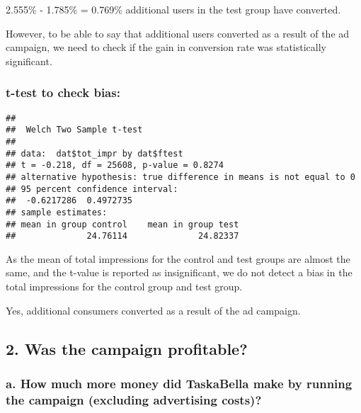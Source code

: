 \documentclass[
]{article}
\newenvironment{Shaded}{\begin{snugshade}}{\end{snugshade}}
\newcommand{\KeywordTok}[1]{\textcolor[rgb]{0.13,0.29,0.53}{\textbf{#1}}}
\newcommand{\NormalTok}[1]{#1}
\newcommand{\OperatorTok}[1]{\textcolor[rgb]{0.81,0.36,0.00}{\textbf{#1}}}
\begin{document}
2.555\% - 1.785\% = 0.769\% additional users in the test group have
converted.

However, to be able to say that additional users converted as a result
of the ad campaign, we need to check if the gain in conversion rate was
statistically significant.

\hypertarget{t-test-to-check-bias}{%
\subsubsection{t-test to check bias:}\label{t-test-to-check-bias}}

\begin{Shaded}
\end{Shaded}

\begin{verbatim}
## 
##  Welch Two Sample t-test
## 
## data:  dat$tot_impr by dat$ftest
## t = -0.218, df = 25608, p-value = 0.8274
## alternative hypothesis: true difference in means is not equal to 0
## 95 percent confidence interval:
##  -0.6217286  0.4972735
## sample estimates:
## mean in group control    mean in group test 
##              24.76114              24.82337
\end{verbatim}

As the mean of total impressions for the control and test groups are
almost the same, and the t-value is reported as insignificant, we do not
detect a bias in the total impressions for the control group and test
group.

Yes, additional consumers converted as a result of the ad campaign.

\hypertarget{was-the-campaign-profitable}{%
\subsection{2. Was the campaign
profitable?}\label{was-the-campaign-profitable}}

\hypertarget{a.-how-much-more-money-did-taskabella-make-by-running-the-campaign-excluding-advertising-costs}{%
\subsubsection{a. How much more money did TaskaBella make by running the
campaign (excluding advertising
costs)?}\label{a.-how-much-more-money-did-taskabella-make-by-running-the-campaign-excluding-advertising-costs}}
\end{document}
